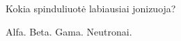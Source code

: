 \question Kokia spinduliuotė labiausiai jonizuoja? \begin{choices}
    \choice Alfa.
    \choice Beta.
    \choice Gama.
    \choice Neutronai.
\end{choices}
